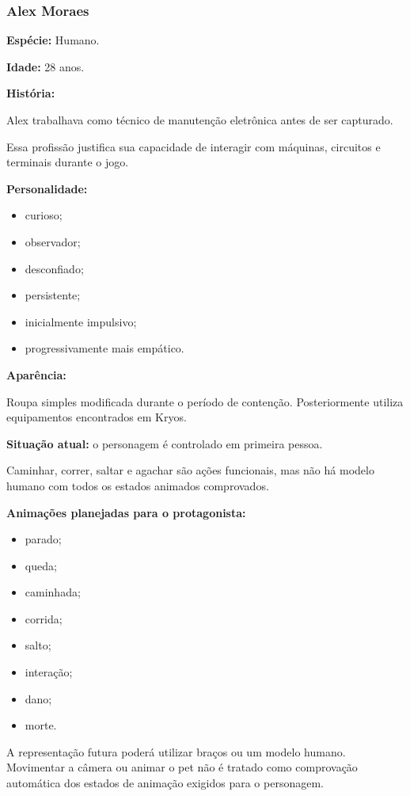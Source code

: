 \documentclass[12pt,a4paper]{article}
\begin{document}
\subsubsection*{Alex Moraes}

\textbf{Espécie:} Humano.

\textbf{Idade:} 28 anos.

\textbf{História:}

Alex trabalhava como técnico de manutenção eletrônica antes de ser
capturado.

Essa profissão justifica sua capacidade de interagir com máquinas,
circuitos e terminais durante o jogo.

\textbf{Personalidade:}

\begin{itemize}
    \item curioso;
    \item observador;
    \item desconfiado;
    \item persistente;
    \item inicialmente impulsivo;
    \item progressivamente mais empático.
\end{itemize}

\textbf{Aparência:}

Roupa simples modificada durante o período de contenção.
Posteriormente utiliza equipamentos encontrados em Kryos.

\textbf{Situação atual:} o personagem é controlado em primeira pessoa.

Caminhar, correr, saltar e agachar são ações funcionais, mas não há
modelo humano com todos os estados animados comprovados.

\textbf{Animações planejadas para o protagonista:}

\begin{itemize}
    \item parado;
    \item queda;
    \item caminhada;
    \item corrida;
    \item salto;
    \item interação;
    \item dano;
    \item morte.
\end{itemize}

A representação futura poderá utilizar braços ou um modelo humano.
Movimentar a câmera ou animar o pet não é tratado como comprovação
automática dos estados de animação exigidos para o personagem.
\end{document}
